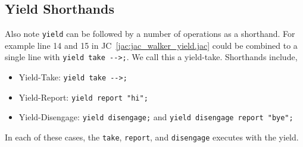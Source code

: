 \subsection{Yield Shorthands}
\par
Also note \lstinline{yield} can be followed by a number of operations as a shorthand. For example line 14 and 15 in JC~\ref{jac:jac_walker_yield.jac} could be combined to a single line with \lstinline{yield take -->;}. We call this a yield-take. Shorthands include,
\begin{itemize}
    \item Yield-Take: \lstinline{yield take -->;}
    \item Yield-Report: \lstinline{yield report "hi";}
    \item Yield-Disengage: \lstinline{yield disengage;} and \lstinline{yield disengage report "bye";}
\end{itemize}
In each of these cases, the \lstinline{take}, \lstinline{report}, and \lstinline{disengage} executes with the yield.


